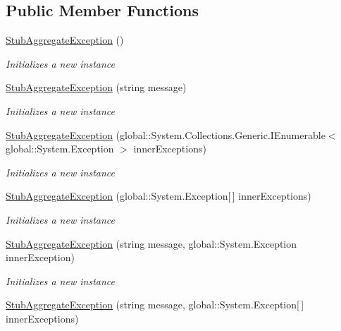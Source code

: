 \subsection*{Public Member Functions}
\begin{DoxyCompactItemize}
\item 
\hyperlink{class_system_1_1_fakes_1_1_stub_aggregate_exception_afc71ef742c70f1c9bc0946cd055997e4}{Stub\-Aggregate\-Exception} ()
\begin{DoxyCompactList}\small\item\em Initializes a new instance\end{DoxyCompactList}\item 
\hyperlink{class_system_1_1_fakes_1_1_stub_aggregate_exception_a6748a303cf7938b1226a113a8a6f5ef4}{Stub\-Aggregate\-Exception} (string message)
\begin{DoxyCompactList}\small\item\em Initializes a new instance\end{DoxyCompactList}\item 
\hyperlink{class_system_1_1_fakes_1_1_stub_aggregate_exception_ac778eff61eb6718f33fd4c7d91e8dcd5}{Stub\-Aggregate\-Exception} (global\-::\-System.\-Collections.\-Generic.\-I\-Enumerable$<$ global\-::\-System.\-Exception $>$ inner\-Exceptions)
\begin{DoxyCompactList}\small\item\em Initializes a new instance\end{DoxyCompactList}\item 
\hyperlink{class_system_1_1_fakes_1_1_stub_aggregate_exception_a8de95358b6eae7407052435517538ed0}{Stub\-Aggregate\-Exception} (global\-::\-System.\-Exception\mbox{[}$\,$\mbox{]} inner\-Exceptions)
\begin{DoxyCompactList}\small\item\em Initializes a new instance\end{DoxyCompactList}\item 
\hyperlink{class_system_1_1_fakes_1_1_stub_aggregate_exception_a38834ce81a4a83119b28cb49b853633d}{Stub\-Aggregate\-Exception} (string message, global\-::\-System.\-Exception inner\-Exception)
\begin{DoxyCompactList}\small\item\em Initializes a new instance\end{DoxyCompactList}\item 
\hyperlink{class_system_1_1_fakes_1_1_stub_aggregate_exception_ac6a1a5f781670464da7bc313b954722a}{Stub\-Aggregate\-Exception} (string message, global\-::\-System.\-Exception\mbox{[}$\,$\mbox{]} inner\-Exceptions)

\end{DoxyCompactItemize}
